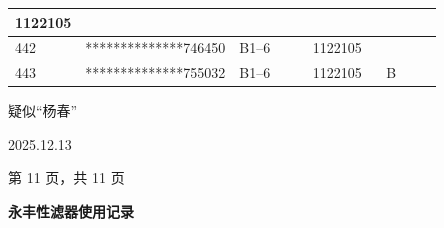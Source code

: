 \documentclass[UTF8,10pt,a4paper,fontset=fandol]{ctexart}
\newcommand{\fieldvalue}[1]{#1}
\newcommand{\handwritten}[1]{#1}
\begin{document}
\begin{center}
\begin{tabular}{|p{0.07\linewidth}|p{0.24\linewidth}|p{0.20\linewidth}|p{0.18\linewidth}|p{0.16\linewidth}|}
\fieldvalue{1122105} & \\
\hline
\fieldvalue{442} &
\fieldvalue{**************746450} &
\fieldvalue{B1--6} &
\fieldvalue{1122105} & \\
\hline
\fieldvalue{443} &
\fieldvalue{**************755032} &
\fieldvalue{B1--6} &
\fieldvalue{1122105} &
\fieldvalue{B} \\
\hline
\end{tabular}
\end{center}

\handwritten{疑似“杨春”}

\handwritten{2025.12.13}

\begin{center}
第 11 页，共 11 页
\end{center}

\newpage

\begin{center}
\textbf{永丰性滤器使用记录}
\end{center}
\end{document}
